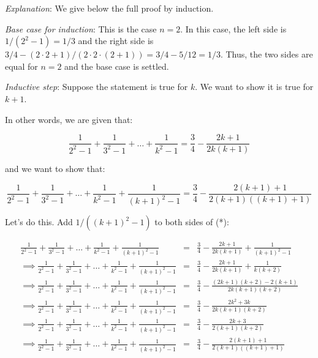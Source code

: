 \documentclass[10pt]{amsart}
\begin{document}
\begin{enumerate}
  {\em Explanation}: We give below the full proof by induction.

    {\em Base case for induction}: This is the case $n = 2$. In this
    case, the left side is $1/(2^2 - 1) = 1/3$ and the right side is
    $3/4 - (2 \cdot 2 + 1)/(2 \cdot 2 \cdot (2 + 1)) = 3/4 - 5/12 =
    1/3$. Thus, the two sides are equal for $n = 2$ and the base case
    is settled.

    {\em Inductive step}: Suppose the statement is true for $k$. We
    want to show it is true for $k + 1$.

    In other words, we are given that:

    \begin{equation*}
      \frac{1}{2^2 - 1} + \frac{1}{3^2 - 1} + \dots + \frac{1}{k^2 - 1} = \frac{3}{4} - \frac{2k + 1}{2k(k+1)} \tag{*}
    \end{equation*}

    and we want to show that:

    \begin{equation*}
      \frac{1}{2^2 - 1} + \frac{1}{3^2 - 1} + \dots + \frac{1}{k^2 - 1} + \frac{1}{(k + 1)^2 - 1} = \frac{3}{4} - \frac{2(k+1) + 1}{2(k+1)((k+1)+1)} \tag{**}
    \end{equation*}

    Let's do this. Add $1/((k+1)^2 - 1)$ to both sides of (*):

    \begin{eqnarray*}
      \frac{1}{2^2 - 1} + \frac{1}{3^2 - 1} + \dots + \frac{1}{k^2 - 1} + \frac{1}{(k + 1)^2 - 1} & = & \frac{3}{4} - \frac{2k + 1}{2k(k+1)} + \frac{1}{(k+1)^2 - 1} \\
      \implies \frac{1}{2^2 - 1} + \frac{1}{3^2 - 1} + \dots + \frac{1}{k^2 - 1} + \frac{1}{(k + 1)^2 - 1} & = & \frac{3}{4} - \frac{2k + 1}{2k(k+1)} + \frac{1}{k(k+2)}\\
      \implies \frac{1}{2^2 - 1} + \frac{1}{3^2 - 1} + \dots + \frac{1}{k^2 - 1} + \frac{1}{(k + 1)^2 - 1}& = &\frac{3}{4} - \frac{(2k + 1)(k+2) - 2(k + 1)}{2k(k+1)(k+2)}\\
      \implies \frac{1}{2^2 - 1} + \frac{1}{3^2 - 1} + \dots + \frac{1}{k^2 - 1} + \frac{1}{(k + 1)^2 - 1}& = &\frac{3}{4} - \frac{2k^2 + 3k}{2k(k+1)(k+2)}\\
      \implies \frac{1}{2^2 - 1} + \frac{1}{3^2 - 1} + \dots + \frac{1}{k^2 - 1} + \frac{1}{(k + 1)^2 - 1}& = &\frac{3}{4} - \frac{2k + 3}{2(k+1)(k+2)}\\
      \implies \frac{1}{2^2 - 1} + \frac{1}{3^2 - 1} + \dots + \frac{1}{k^2 - 1} + \frac{1}{(k + 1)^2 - 1}& = &\frac{3}{4} - \frac{2(k+1) + 1}{2(k+1)((k+1)+1)}
    \end{eqnarray*}


\end{enumerate}
\end{document}

